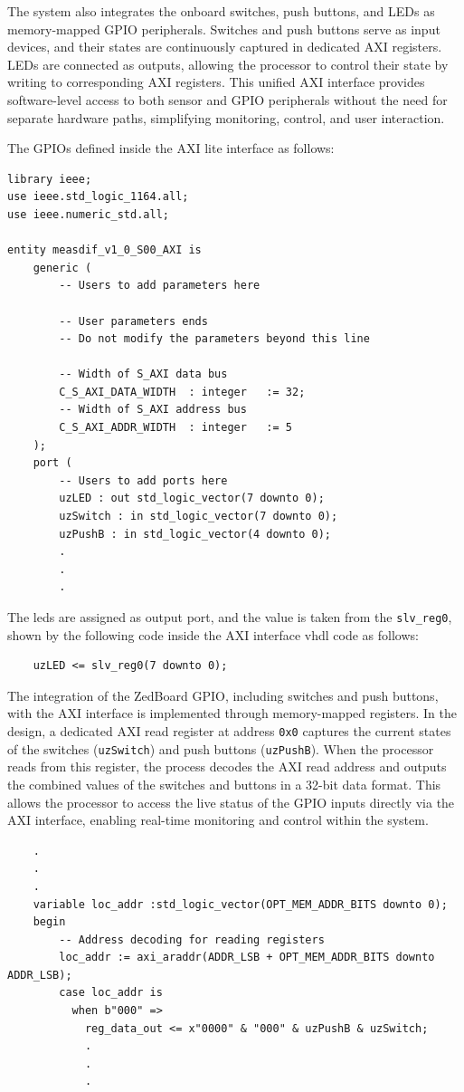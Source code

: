 The system also integrates the onboard switches, push buttons, and LEDs as memory-mapped GPIO peripherals. Switches and push buttons serve as input devices, and their states are continuously captured in dedicated AXI registers. LEDs are connected as outputs, allowing the processor to control their state by writing to corresponding AXI registers. This unified AXI interface provides software-level access to both sensor and GPIO peripherals without the need for separate hardware paths, simplifying monitoring, control, and user interaction.

The GPIOs defined inside the AXI lite interface as follows: 
\begin{verbatim}
library ieee;
use ieee.std_logic_1164.all;
use ieee.numeric_std.all;

entity measdif_v1_0_S00_AXI is
	generic (
		-- Users to add parameters here

		-- User parameters ends
		-- Do not modify the parameters beyond this line

		-- Width of S_AXI data bus
		C_S_AXI_DATA_WIDTH	: integer	:= 32;
		-- Width of S_AXI address bus
		C_S_AXI_ADDR_WIDTH	: integer	:= 5
	);
	port (
		-- Users to add ports here
        uzLED : out std_logic_vector(7 downto 0);
        uzSwitch : in std_logic_vector(7 downto 0);
        uzPushB : in std_logic_vector(4 downto 0);
        .
        .
        .
\end{verbatim}
The leds are assigned as output port, and the value is taken from the \texttt{slv\_reg0}, shown by the following code inside the AXI interface vhdl code as follows: 

\begin{verbatim}
	uzLED <= slv_reg0(7 downto 0);
\end{verbatim}


The integration of the ZedBoard GPIO, including switches and push buttons, with the AXI interface is implemented through memory-mapped registers. In the design, a dedicated AXI read register at address \texttt{0x0} captures the current states of the switches (\texttt{uzSwitch}) and push buttons (\texttt{uzPushB}). When the processor reads from this register, the process decodes the AXI read address and outputs the combined values of the switches and buttons in a 32-bit data format. This allows the processor to access the live status of the GPIO inputs directly via the AXI interface, enabling real-time monitoring and control within the system.
\begin{verbatim}
	.
	.
	.
	variable loc_addr :std_logic_vector(OPT_MEM_ADDR_BITS downto 0);
	begin
	    -- Address decoding for reading registers
	    loc_addr := axi_araddr(ADDR_LSB + OPT_MEM_ADDR_BITS downto ADDR_LSB);
	    case loc_addr is
	      when b"000" =>
	        reg_data_out <= x"0000" & "000" & uzPushB & uzSwitch;
	        .
	        .
	        .
\end{verbatim}

